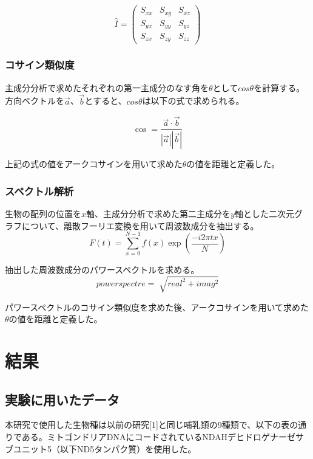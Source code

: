 \documentclass[twocolumn,paper=a4paper,landscape,fontsize=9pt]{jlreq}
\begin{document}
\begin{equation}
  \hat{I}=
\begin{pmatrix}
  S_{xx} & S_{xy} & S_{xz} \\
  S_{yx} & S_{yy} & S_{yz} \\
  S_{zx} & S_{zy} & S_{zz}
\end{pmatrix}
\end{equation}

\subsubsection{コサイン類似度}
主成分分析で求めたそれぞれの第一主成分のなす角を$θ$として$cosθ$を計算する。方向ベクトルを$\vec{a}$、$\vec{b}$とすると、$cosθ$は以下の式で求められる。

\begin{equation}
\cos = \frac{\vec{a}\cdot\vec{b}}{|\vec{a}||\vec{b}|}
\end{equation}

上記の式の値をアークコサインを用いて求めた$θ$の値を距離と定義した。

\subsubsection{スペクトル解析}
生物の配列の位置を$x$軸、主成分分析で求めた第二主成分を$y$軸とした二次元グラフについて、離散フーリエ変換を用いて周波数成分を抽出する。
\begin{equation}
F(t) =\sum^{N-1}_{x = 0}f(x)\exp(\frac{-i2\pi tx}{N})
\end{equation}

抽出した周波数成分のパワースペクトルを求める。
\begin{equation}
powerspectre = \sqrt[]{real^2+imag^2}
\end{equation}

パワースペクトルのコサイン類似度を求めた後、アークコサインを用いて求めた$θ$の値を距離と定義した。

\section{結果}
\subsection{実験に用いたデータ}
本研究で使用した生物種は以前の研究[1]と同じ哺乳類の9種類で、以下の表の通りである。ミトゴンドリアDNAにコードされているNDAHデヒドロゲナーゼサブユニット5（以下ND5タンパク質）を使用した。
\end{document}
